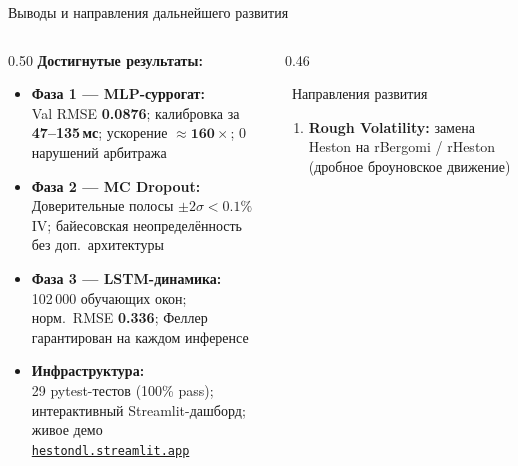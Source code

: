 \documentclass[aspectratio=169, 10pt]{beamer}
\begin{document}
\begin{frame}{Выводы и направления дальнейшего развития}
  \begin{columns}[T]

    \begin{column}{0.50\textwidth}
      \textbf{Достигнутые результаты:}\\[0.4em]

      \begin{itemize}\small
        \item[\checkmark] \textbf{Фаза 1 — MLP-суррогат:}\\
              Val RMSE \textbf{0.0876}; калибровка за \textbf{47–135\,мс};
              ускорение $\approx\mathbf{160\times}$; 0 нарушений арбитража

        \vspace{0.3em}
        \item[\checkmark] \textbf{Фаза 2 — MC Dropout:}\\
              Доверительные полосы $\pm 2\sigma < 0.1\%$ IV;
              байесовская неопределённость без доп.\ архитектуры

        \vspace{0.3em}
        \item[\checkmark] \textbf{Фаза 3 — LSTM-динамика:}\\
              102\,000 обучающих окон; норм.\ RMSE \textbf{0.336};
              Феллер гарантирован на каждом инференсе

        \vspace{0.3em}
        \item[\checkmark] \textbf{Инфраструктура:}\\
              29 pytest-тестов (100\% pass);
              интерактивный Streamlit-дашборд;
              живое демо \href{https://hestondl.streamlit.app/}%
              {\texttt{hestondl.streamlit.app}}
      \end{itemize}
    \end{column}

    \begin{column}{0.46\textwidth}
      \begin{alertblock}{\faArrowRight\ Направления развития}
        \small
        \begin{enumerate}
          \item \textbf{Rough Volatility:}
                замена Heston на rBergomi / rHeston
                (дробное броуновское движение)


\end{enumerate}
\end{alertblock}
\end{column}
\end{columns}
\end{frame}
\end{document}
